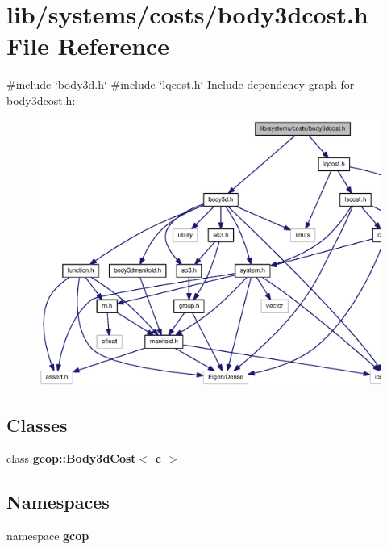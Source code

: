 \section{lib/systems/costs/body3dcost.h \-File \-Reference}
\label{body3dcost_8h}
{\ttfamily \#include \char`\"{}body3d.\-h\char`\"{}}\*
{\ttfamily \#include \char`\"{}lqcost.\-h\char`\"{}}\*
\-Include dependency graph for body3dcost.\-h\-:
\nopagebreak
\begin{figure}[H]
\begin{center}
\leavevmode
\includegraphics[width=350pt]{body3dcost_8h__incl}
\end{center}
\end{figure}
\subsection*{\-Classes}
\begin{DoxyCompactItemize}
\item 
class {\bf gcop\-::\-Body3d\-Cost$<$ c $>$}
\end{DoxyCompactItemize}
\subsection*{\-Namespaces}
\begin{DoxyCompactItemize}
\item 
namespace {\bf gcop}
\end{DoxyCompactItemize}
